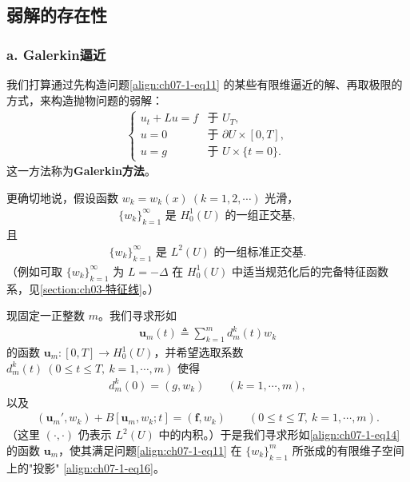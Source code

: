\documentclass[../../main.tex]{subfiles}
\begin{document}
\subsection{弱解的存在性}\label{subsection:ch07-1-2-弱解的存在性}

\subsubsection*{a. Galerkin逼近}

我们打算通过先构造问题\eqref{align:ch07-1-eq11} 的某些有限维逼近的解、再取极限的方式，来构造抛物问题的弱解：
\begin{align}
\begin{cases}
u_t+Lu=f & \text{于 } U_T,\\
u=0 & \text{于 } \partial U\times[0,T],\\
u=g & \text{于 } U\times\{t=0\}.
\end{cases}\label{align:ch07-1-eq11}
\end{align}
这一方法称为\textbf{Galerkin方法}。

更确切地说，假设函数 $w_k=w_k(x)\ (k=1,2,\cdots)$ 光滑，
\begin{align}
\{w_k\}_{k=1}^\infty \text{ 是 } H^1_0(U) \text{ 的一组正交基},\label{align:ch07-1-eq12}
\end{align}
且
\begin{align}
\{w_k\}_{k=1}^\infty \text{ 是 } L^2(U) \text{ 的一组标准正交基}.\label{align:ch07-1-eq13}
\end{align}
（例如可取 $\{w_k\}_{k=1}^\infty$ 为 $L=-\Delta$ 在 $H^1_0(U)$ 中适当规范化后的完备特征函数系，见\cref{section:ch03-特征线}。）

现固定一正整数 $m$。我们寻求形如
\begin{align}
\mathbf{u}_m(t)\triangleq \sum_{k=1}^m d_m^k(t)w_k\label{align:ch07-1-eq14}
\end{align}
的函数 $\mathbf{u}_m:[0,T]\to H^1_0(U)$，并希望选取系数 $d_m^k(t)\ (0\leqslant t\leqslant T,\ k=1,\cdots,m)$ 使得
\begin{align}
d_m^k(0) = (g,w_k)\qquad (k=1,\cdots,m),\label{align:ch07-1-eq15}
\end{align}
以及
\begin{align}
(\mathbf{u}_m',w_k) + B[\mathbf{u}_m,w_k;t] = (\mathbf{f},w_k)\qquad (0\leqslant t\leqslant T,\ k=1,\cdots,m).\label{align:ch07-1-eq16}
\end{align}
（这里 $(\cdot,\cdot)$ 仍表示 $L^2(U)$ 中的内积。）于是我们寻求形如\eqref{align:ch07-1-eq14} 的函数 $\mathbf{u}_m$，使其满足问题\eqref{align:ch07-1-eq11} 在 $\{w_k\}_{k=1}^m$ 所张成的有限维子空间上的"投影" \eqref{align:ch07-1-eq16}。
\end{document}
